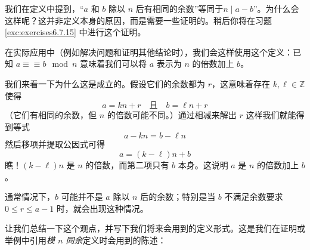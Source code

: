 \begin{remark}
    我们在定义中提到，``$a$ 和 $b$ 除以 $n$ 后有相同的余数''等同于$n \mid a - b$''。为什么会这样呢？这并非定义本身的原因，而是需要一些证明的。稍后你将在习题 \ref{exc:exercises6.7.15} 中进行这个证明。
\end{remark}

\begin{remark}
    在实际应用中（例如解决问题和证明其他结论时），我们会这样使用这个定义：已知 $a ≡\equiv b \mod n$ 意味着我们可以将 $a$ 表示为 $n$ 的倍数加上 $b$。
\end{remark}

我们来看一下为什么这是成立的。假设它们的余数都为 $r$，这意味着存在 $k, \ell \in \mathbb{Z}$ 使得
\[a = kn + r \quad\text{且}\quad b = \ell n + r\]
（它们有相同的余数，但 $n$ 的倍数可能不同。）通过相减来解出 $r$ 这样我们就能得到等式
\[a - kn = b - \ell n\]
然后移项并提取公因式可得
\[a = (k - \ell)n + b\]
瞧！$(k - \ell)n$ 是 $n$ 的倍数，而第二项只有 $b$ 本身。这说明 $a$ 是 $n$ 的倍数加上 $b$。

通常情况下，$b$ 可能并不是 $a$ 除以 $n$ 后的余数；特别是当 $b$ 不满足余数要求 $0 \le r \le a - 1$ 时，就会出现这种情况。

让我们总结一下这个观点，并写下我们将来会用到的定义形式。这是我们在证明或举例中引用\emph{模 $n$ 同余}定义时会用到的陈述：

\setlength{\fboxrule}{2pt}
\begin{center}
\end{center}

